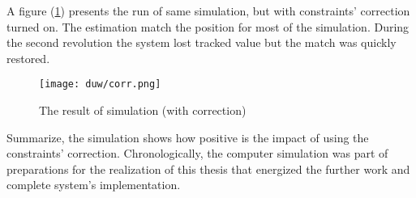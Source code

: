 A figure (\ref{corr}) presents the run of same simulation, but with constraints' correction turned on. 
The estimation match the position for most of the simulation. During the second revolution the system lost tracked value but the match was quickly restored.

\begin{figure}[!h]
	\centering
	\texttt{[image: duw/corr.png]}
	\caption{The result of simulation (with correction)}
	\label{corr}
\end{figure}

\newpage
Summarize, the simulation shows how positive is the impact of using the constraints' correction. Chronologically, the computer simulation was part of preparations for the realization of this thesis that energized the further work and complete system's implementation.